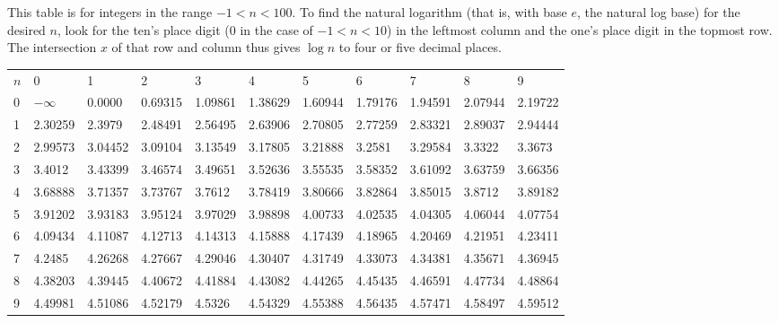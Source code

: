 \documentclass[12pt]{article}
\begin{document}
This table is for integers in the range $-1 < n < 100$. To find the natural logarithm (that is, with base $e$, the natural log base) for the desired $n$, look for the ten's place digit (0 in the case of $-1 < n < 10$) in the leftmost column and the one's place digit in the topmost row. The intersection $x$ of that row and column thus gives $\log n$ to four or five decimal places.

\begin{tabular}{|l|l|l|l|l|l|l|l|l|l|l|}
$n$  & 0  & 1 & 2 & 3 & 4 & 5 & 6 & 7 & 8 & 9 \\
0 & $-\infty$ & 0.0000 & 0.69315 & 1.09861 & 1.38629 & 1.60944 & 1.79176 & 1.94591 & 2.07944 & 2.19722 \\
1 & 2.30259 & 2.3979 & 2.48491 & 2.56495 & 2.63906 & 2.70805 & 2.77259 & 2.83321 & 2.89037 & 2.94444 \\
2 & 2.99573 & 3.04452 & 3.09104 & 3.13549 & 3.17805 & 3.21888 & 3.2581 & 3.29584 & 3.3322 & 3.3673 \\
3 & 3.4012 & 3.43399 & 3.46574 & 3.49651 & 3.52636 & 3.55535 & 3.58352 & 3.61092 & 3.63759 & 3.66356 \\
4 & 3.68888 & 3.71357 & 3.73767 & 3.7612 & 3.78419 & 3.80666 & 3.82864 & 3.85015 & 3.8712 & 3.89182 \\
5 & 3.91202 & 3.93183 & 3.95124 & 3.97029 & 3.98898 & 4.00733 & 4.02535 & 4.04305 & 4.06044 & 4.07754 \\
6 & 4.09434 & 4.11087 & 4.12713 & 4.14313 & 4.15888 & 4.17439 & 4.18965 & 4.20469 & 4.21951 & 4.23411 \\
7 & 4.2485 & 4.26268 & 4.27667 & 4.29046 & 4.30407 & 4.31749 & 4.33073 & 4.34381 & 4.35671 & 4.36945 \\
8 & 4.38203 & 4.39445 & 4.40672 & 4.41884 & 4.43082 & 4.44265 & 4.45435 & 4.46591 & 4.47734 & 4.48864 \\
9 & 4.49981 & 4.51086 & 4.52179 & 4.5326 & 4.54329 & 4.55388 & 4.56435 & 4.57471 & 4.58497 & 4.59512 \\
\end{tabular}
\end{document}
